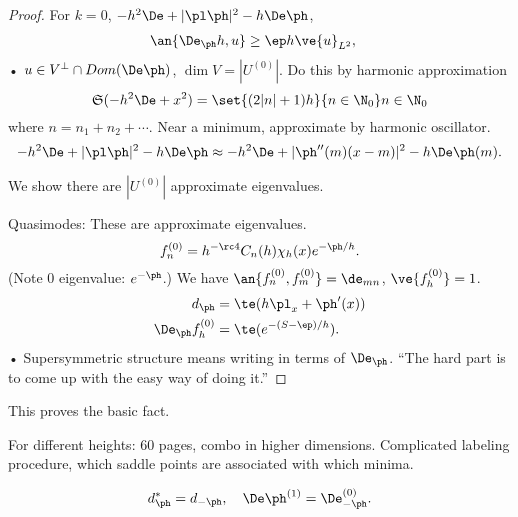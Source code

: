 \begin{proof}
For $k=0$, $-h^2\De  + |\pl \ph|^2 - h\De \ph$, 
\begin{align}
\an{\De_\ph h, u} &\ge \ep h\ve{u}_{L^2},
\end{align}•
$u\in V^{\perp}\cap Dom(\De\ph)$, $\dim V = |U^{(0)}|$. Do this by harmonic approximation %
$$
\mathfrak S(-h^2\De + x^2) =\set{(2|n|+1)h}{n\in \N_0}
n\in \N_0
$$
where $n=n_1+n_2+\cdots$.
Near a minimum, approximate by harmonic oscillator.
$$
-h^2 \De + |\pl \ph|^2 - h\De \ph \approx -h^2 \De + |\ph''(m)(x-m)|^2 - h\De\ph(m).
$$

We show there are $|U^{(0)}|$ approximate eigenvalues. 


Quasimodes: These are approximate eigenvalues. 
$$
f_n^{(0)} = h^{-\rc 4} C_n(h) \chi_h(x) e^{-\ph/h}.
$$
(Note 0 eigenvalue: $e^{-\ph}$.)
We have $\an{f_n^{(0)}, f_m^{(0)}} = \de_{mn}$, $\ve{f_h^{(0)}}=1$.
\begin{align}
d_\ph &= \te(h\pl_x + \ph'(x))\\
\De_\ph f_h^{(0)}&= \te(e^{-(S-\ep)/h}).
\end{align}•
Supersymmetric structure means writing in terms of $\De_\ph$. 
``The hard part is to come up with the easy way of doing it.''
\end{proof}
This proves the basic fact.

For different heights: 60 pages, combo in higher dimensions. Complicated labeling procedure, which saddle points are associated with which minima. 


$$
d_\ph^* = d_{-\ph}, \quad \De\ph^{(1)} = \De_{-\ph}^{(0)}.
$$

